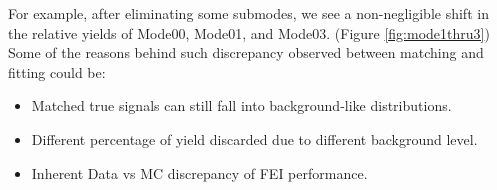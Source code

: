 For example, after eliminating some submodes, we see a non-negligible shift in the relative yields of Mode00, Mode01, and Mode03. (Figure \ref{fig:mode1thru3}) 
Some of the reasons behind such discrepancy observed between matching and fitting could be:
\begin{itemize}
\item Matched true signals can still fall into background-like distributions.
\item Different percentage of yield discarded due to different background level.
\item Inherent Data vs MC discrepancy of FEI performance.
\end{itemize}
